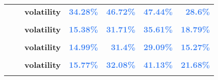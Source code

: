 \documentclass[
  authoryear,
  preprint,
  3p]{elsarticle}
\begin{document}
\begin{longtable}[t]{>{}l>{}l>{}l>{}r>{}r>{}r>{}r}
\textbf{} & \textbf{} & \textbf{volatility} & \textcolor[HTML]{4285f4}{\textbf{34.28\%}} & \textcolor[HTML]{4285f4}{\textbf{46.72\%}} & \textcolor[HTML]{4285f4}{\textbf{47.44\%}} & \textcolor[HTML]{4285f4}{\textbf{28.6\%}}\\
\textbf{\cellcolor{gray!10}{Tin-refined (XLME)}} & \textbf{\cellcolor{gray!10}{whole period}} & \textbf{\cellcolor{gray!10}{mean}} & \textcolor[HTML]{4285f4}{\textbf{\cellcolor{gray!10}{4.07\%}}} & \textcolor[HTML]{4285f4}{\textbf{\cellcolor{gray!10}{*29.1\%}}} & \textcolor[HTML]{4285f4}{\textbf{\cellcolor{gray!10}{7.46\%}}} & \textcolor[HTML]{4285f4}{\textbf{\cellcolor{gray!10}{1.68\%}}}\\
\textbf{} & \textbf{} & \textbf{volatility} & \textcolor[HTML]{4285f4}{\textbf{15.38\%}} & \textcolor[HTML]{4285f4}{\textbf{31.71\%}} & \textcolor[HTML]{4285f4}{\textbf{35.61\%}} & \textcolor[HTML]{4285f4}{\textbf{18.79\%}}\\
\addlinespace
\textbf{\cellcolor{gray!10}{}} & \textbf{\cellcolor{gray!10}{backwardation}} & \textbf{\cellcolor{gray!10}{mean}} & \textcolor[HTML]{4285f4}{\textbf{\cellcolor{gray!10}{*15.83\%}}} & \textcolor[HTML]{4285f4}{\textbf{\cellcolor{gray!10}{34.62\%}}} & \textcolor[HTML]{4285f4}{\textbf{\cellcolor{gray!10}{23.7\%}}} & \textcolor[HTML]{4285f4}{\textbf{\cellcolor{gray!10}{4.48\%}}}\\
\textbf{} & \textbf{} & \textbf{volatility} & \textcolor[HTML]{4285f4}{\textbf{14.99\%}} & \textcolor[HTML]{4285f4}{\textbf{31.4\%}} & \textcolor[HTML]{4285f4}{\textbf{29.09\%}} & \textcolor[HTML]{4285f4}{\textbf{15.27\%}}\\
\textbf{\cellcolor{gray!10}{}} & \textbf{\cellcolor{gray!10}{contango}} & \textbf{\cellcolor{gray!10}{mean}} & \textcolor[HTML]{4285f4}{\textbf{\cellcolor{gray!10}{-7.78\%}}} & \textcolor[HTML]{4285f4}{\textbf{\cellcolor{gray!10}{23.88\%}}} & \textcolor[HTML]{4285f4}{\textbf{\cellcolor{gray!10}{-6.82\%}}} & \textcolor[HTML]{4285f4}{\textbf{\cellcolor{gray!10}{-1.69\%}}}\\
\textbf{} & \textbf{} & \textbf{volatility} & \textcolor[HTML]{4285f4}{\textbf{15.77\%}} & \textcolor[HTML]{4285f4}{\textbf{32.08\%}} & \textcolor[HTML]{4285f4}{\textbf{41.13\%}} & \textcolor[HTML]{4285f4}{\textbf{21.68\%}}\\
\textbf{\cellcolor{gray!10}{Zinc (XLME)}} & \textbf{\cellcolor{gray!10}{whole period}} & \textbf{\cellcolor{gray!10}{mean}} & \textcolor[HTML]{4285f4}{\textbf{\cellcolor{gray!10}{-4.52\%}}} & \textcolor[HTML]{4285f4}{\textbf{\cellcolor{gray!10}{20.13\%}}} & \textcolor[HTML]{4285f4}{\textbf{\cellcolor{gray!10}{7.62\%}}} & \textcolor[HTML]{4285f4}{\textbf{\cellcolor{gray!10}{9.07\%}}}\\

\end{longtable}
\end{document}
